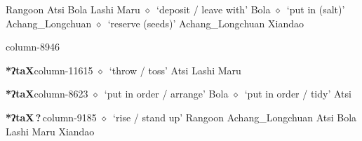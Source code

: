          Rangoon 
\hspace{1ex}
         Atsi 
\hspace{1ex}
         Bola 
\hspace{1ex}
         Lashi 
\hspace{1ex}
         Maru 
\hspace{1ex}
         $\diamond$~`deposit / leave with'
         Bola 
\hspace{1ex}
         $\diamond$~`put in (salt)'
         Achang\_Longchuan 
\hspace{1ex}
         $\diamond$~`reserve (seeds)'
         Achang\_Longchuan 
\hspace{1ex}
         Xiandao 
  \item {\footnotesize \textbf{}}{\tiny column-8946}
  \item {\footnotesize \textbf{*ʔtaX}}{\tiny column-11615}
         $\diamond$~`throw / toss'
         Atsi 
\hspace{1ex}
         Lashi 
\hspace{1ex}
         Maru 
  \item {\footnotesize \textbf{*ʔtaX}}{\tiny column-8623}
         $\diamond$~`put in order / arrange'
         Bola 
\hspace{1ex}
         $\diamond$~`put in order / tidy'
         Atsi 
  \item {\footnotesize \textbf{*ʔtaX\,?\,}}{\tiny column-9185}
         $\diamond$~`rise / stand up'
         Rangoon 
\hspace{1ex}
         Achang\_Longchuan 
\hspace{1ex}
         Atsi 
\hspace{1ex}
         Bola 
\hspace{1ex}
         Lashi 
\hspace{1ex}
         Maru 
\hspace{1ex}
         Xiandao 
